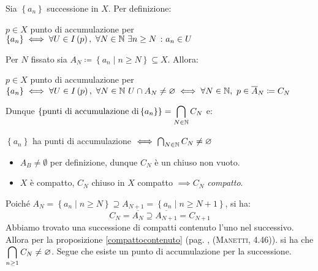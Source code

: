 \begin{demonstration}
Sia	$\left\{a_n\right\}$ successione in $X$. Per definizione:
\begin{center}
$p\in X$ punto di accumulazione per $\left\{a_n\right\}\iff \forall U\in I\left(p\right),\ \forall N\in\mathbb{N}\ \exists n\geq N\ \colon a_n\in U$
\end{center}
Per $N$ fissato sia $A_N\coloneqq \left\{a_n\mid n\geq N\right\}\subseteq X$. Allora:
\begin{center}
	$p\in X$ punto di accumulazione per $\displaystyle\left\{a_n\right\}\iff \forall U\in I\left(p\right),\ \forall N\in\mathbb{N}\ U\cap A_N\neq\varnothing\iff \forall N\in\mathbb{N},\ p\in\overline{A}_N\coloneqq C_N$
\end{center}
Dunque $\displaystyle\left\{\text{punti di accumulazione di} \left\{a_n\right\}\right\}=\mathop{{\bigcap}}\displaylimits_{N\in\mathbb{N}}C_N$ e:
 \begin{center}
 	$\left\{a_n\right\}$ ha punti di accumulazione $\iff \mathop{{\bigcap}}\displaylimits_{N\in\mathbb{N}}C_N\neq\varnothing$
 \end{center}
\begin{itemize}
	\item $A_B\neq \emptyset$ per definizione, dunque $C_N$ è un chiuso non vuoto.
	\item $X$ è compatto, $C_N$ chiuso in $X$ compatto $\implies C_N$ \textit{compatto}.
\end{itemize}
Poiché $A_N=\left\{a_n\mid n\geq N\right\}\supseteq A_ {N+1}=\left\{a_n\mid n\geq N+1\right\}$, si ha:
\begin{equation*}
C_N=\overline{A_N}\supseteq \overline{A_{N+1}}=C_{N+1}
\end{equation*}
Abbiamo trovato una successione di compatti contenuto l'uno nel successivo. Allora per la proposizione \ref{compattocontenuto} (pag. \pageref{compattocontenuto}, \textsc{(Manetti, 4.46)}). si ha che $\displaystyle\mathop{{\bigcap}}\displaylimits_{n\geq 1}C_N\neq \varnothing$.
Segue che esiste un punto di accumulazione per la successione.
\end{demonstration}
